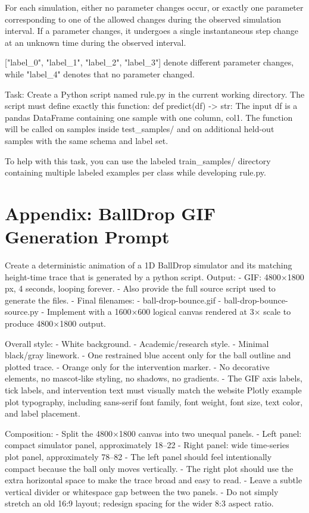 \documentclass[11pt]{article}
\begin{document}
\begin{DocCode}
\begin{DocCode}
\begin{DocCode}
For each simulation, either no parameter changes occur, or exactly one parameter corresponding to one of the allowed changes during the observed simulation interval.
If a parameter changes, it undergoes a single instantaneous step change at an unknown time during the observed interval.

["label_0", "label_1", "label_2", "label_3"] denote different parameter changes, while "label_4" denotes that no parameter changed.

Task:
Create a Python script named rule.py in the current working directory.
The script must define exactly this function:
def predict(df) -> str:
The input df is a pandas DataFrame containing one sample with one column, col1.
The function will be called on samples inside test_samples/ and on additional held-out samples with the same schema and label set.

To help with this task, you can use the labeled train_samples/ directory containing multiple labeled examples per class while developing rule.py.
\end{DocCode}

\label{sec:website-ball-drop-gif-prompt}
\section*{Appendix: BallDrop GIF Generation Prompt}

\begin{DocCode}
Create a deterministic animation of a 1D BallDrop simulator and its matching height-time trace that is generated by a python script.
 Output:
  - GIF: 4800×1800 px, 4 seconds, looping forever.
  - Also provide the full source script used to generate the files.
  - Final filenames:
    - ball-drop-bounce.gif
    - ball-drop-bounce-source.py
  - Implement with a 1600×600 logical canvas rendered at 3× scale to produce 4800×1800 output.

  Overall style:
  - White background.
  - Academic/research style.
  - Minimal black/gray linework.
  - One restrained blue accent only for the ball outline and plotted trace.
  - Orange only for the intervention marker.
  - No decorative elements, no mascot-like styling, no shadows, no gradients.
  - The GIF axis labels, tick labels, and intervention text must visually match the website
    Plotly example plot typography, including sans-serif font family, font weight, font size,
    text color, and label placement.

  Composition:
  - Split the 4800×1800 canvas into two unequal panels.
  - Left panel: compact simulator panel, approximately 18–22%
  - Right panel: wide time-series plot panel, approximately 78–82%
  - The left panel should feel intentionally compact because the ball only moves vertically.
  - The right plot should use the extra horizontal space to make the trace broad and easy to read.
  - Leave a subtle vertical divider or whitespace gap between the two panels.
  - Do not simply stretch an old 16:9 layout; redesign spacing for the wider 8:3 aspect ratio.


\end{DocCode}
\end{DocCode}
\end{DocCode}
\end{document}
